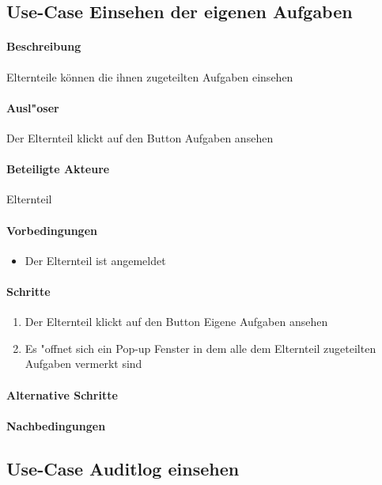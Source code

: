   
  
  
	\newpage
	\subsection{Use-Case Einsehen der eigenen Aufgaben}
	\paragraph{Beschreibung}
	Elternteile können die ihnen zugeteilten Aufgaben einsehen 
	\paragraph{Ausl"oser}
	Der Elternteil klickt auf den Button \dq Aufgaben ansehen\dq
	\paragraph{Beteiligte Akteure}   \leavevmode \newline
	Elternteil
	\paragraph{Vorbedingungen}
	\begin{itemize}
		\item Der Elternteil ist angemeldet
	\end{itemize}
	
	\paragraph{Schritte}
	\begin{enumerate}
		\item Der Elternteil klickt auf den Button \dq Eigene Aufgaben ansehen \dq
		\item Es "offnet sich ein Pop-up Fenster in dem alle dem Elternteil zugeteilten Aufgaben vermerkt sind
	\end{enumerate}
  
	\paragraph{Alternative Schritte}
	\paragraph{Nachbedingungen}

  
  
  
  \newpage
 \subsection{Use-Case Auditlog einsehen}
